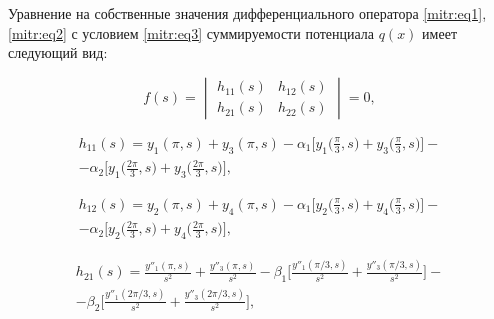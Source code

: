 \begin{lemma}[3] Уравнение на собственные значения дифференциального оператора \eqref{mitr:eq1}, \eqref{mitr:eq2} с условием \eqref{mitr:eq3} суммируемости потенциала $q(x)$ имеет следующий вид\/{\rm:}

\begin{equation}

\label{mitr:eq17}

f(s)= \begin{vmatrix}

h_{11} (s) &h_{12} (s)\\

h_{21} (s) &h_{22}(s)

\end{vmatrix}

=0,

\end{equation}


\begin{multline}

h_{11}(s)=y_1(\pi,s)+y_3(\pi,s)-\alpha_1\bigg[y_1\bigg(\frac\pi3,s\bigg)+

 y_3\bigg(\frac\pi3,s\bigg)\bigg]- \\-

\alpha_2\bigg[y_1\bigg(\frac{2\pi}3,s\bigg)+  y_3\bigg(\frac{2\pi}3,s\bigg)\bigg],

\end{multline}

\begin{multline}

h_{12}(s)=y_2(\pi,s)+y_4(\pi,s)-\alpha_1\bigg[y_2\bigg(\frac\pi3,s\bigg)+

 y_4\bigg(\frac\pi3,s\bigg)\bigg]-\\ -

\alpha_2\bigg[y_2\bigg(\frac{2\pi}3,s\bigg)+  y_4\bigg(\frac{2\pi}3,s\bigg)\bigg],

\end{multline}

\begin{multline}

h_{21}(s)=\frac{y''_1(\pi,s)}{s^2}+\frac{y''_3(\pi,s)}{s^2}-\beta_1\bigg[

\frac{y''_1(\pi/3,s)}{s^2}+

\frac{y''_3(\pi/3,s)}{s^2}\bigg]-\\-

\beta_2\bigg[

\frac{y''_1({2\pi}/3,s)}{s^2}+\frac{y''_3({2\pi}/3,s)}{s^2}\bigg],


\end{multline}
\end{lemma}

